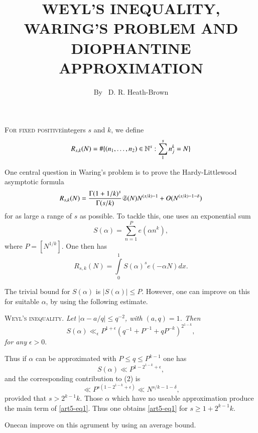 
\title{WEYL'S INEQUALITY, WARING'S PROBLEM AND DIOPHANTINE APPROXIMATION}

\author{By~  D. R. Heath-Brown}

\date{}
\maketitle

\setcounter{pageoriginal}{40} 


\textsc{For fixed positive}\pageoriginale integers $s$ and $k$, we define
$$
R_{s,k} (N) = \# \{(n_1, \ldots, n_2) \in \mathbb{N}^s : \sum\limits^s_1 n^k_j = N\}
$$

One central question in Waring's problem is to prove the Hardy-Littlewood asymptotic formula
\begin{equation}
R_{s,k} (N) = \frac{\Gamma (1+1/k)^s}{\Gamma (s/k)} \mathfrak{S} (N) N^{(s/k) -1} + O (N^{(s/k) -1 - \delta}) 
\label{art5-eq1}
\end{equation}
for as large a range of $s$ as possible. To tackle this, one uses an exponential sum
$$
S (\alpha) = \sum\limits^P_{n=1} e(\alpha n^k),
$$
where $P= [N^{1/k}]$. One then has
\begin{equation}
R_{s,k} (N) = \int\limits^1_0 S (\alpha)^s e(-\alpha N) dx.  \label{art5-eq2}
\end{equation}

The trivial bound for $S(\alpha)$ is $|S(\alpha)| \leqslant P$. However, one can improve on this for suitable $\alpha$, by using the following estimate.

\noindent
\textsc{Weyl's inequality}. \textit{Let $|\alpha - a/q| \leqslant q^{-2}$, with $(a, q) =1$. Then }
$$
S(\alpha) \ll_\epsilon P^{1+\epsilon} (q^{-1} + P^{-1} + qP^{-k})^{2^{1-k}},
$$
\textit{for any  } $\epsilon >0$.

Thus if $\alpha$ can be approximated with $P\leqslant q \leqslant P^{k-1}$ one has 
\begin{equation}
S (\alpha) \ll P^{1-2^{1-k} + \epsilon}, \label{art5-eq3}
\end{equation}
and the corresponding contribution to (2) is
$$
\ll P^{s(1-2^{1-k} +\epsilon)} \ll N^{s/k -1-\delta}, 
$$
provided that $s > 2^{k-1} k$. Those $\alpha$ which have no useable approximation produce the main term of \eqref{art5-eq1}. Thus one obtains \eqref{art5-eq1} for $s \geqslant 1+ 2^{k-1} k$.

One\pageoriginale can improve on this agrument by using an average bound. 

